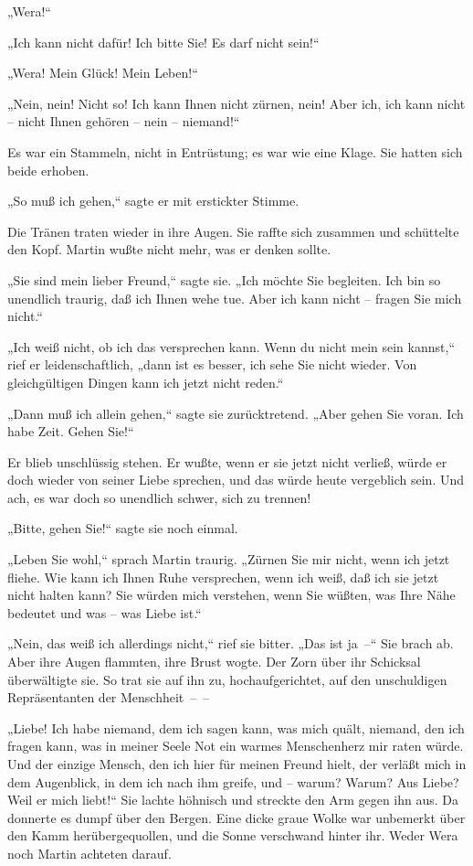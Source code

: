 „Wera!“

„Ich kann nicht dafür! Ich bitte Sie! Es darf nicht sein!“

„Wera! Mein Glück! Mein Leben!“

„Nein, nein! Nicht so! Ich kann Ihnen nicht zürnen, nein! Aber ich,
ich kann nicht – nicht Ihnen gehören – nein – niemand!“

Es war ein Stammeln, nicht in Entrüstung; es war wie eine Klage.
Sie hatten sich beide erhoben.

„So muß ich gehen,“ sagte er mit erstickter Stimme.

Die Tränen traten wieder in ihre Augen. Sie raffte sich zusammen
und schüttelte den Kopf. Martin wußte nicht mehr, was er denken
sollte.

„Sie sind mein lieber Freund,“ sagte sie. „Ich möchte Sie
begleiten. Ich bin so unendlich traurig, daß ich Ihnen wehe tue.
Aber ich kann nicht – fragen Sie mich nicht.“

„Ich weiß nicht, ob ich das versprechen kann. Wenn du nicht mein
sein kannst,“ rief er leidenschaftlich, „dann ist es besser, ich
sehe Sie nicht wieder. Von gleichgültigen Dingen kann ich jetzt
nicht reden.“

„Dann muß ich allein gehen,“ sagte sie zurücktretend. „Aber gehen
Sie voran. Ich habe Zeit. Gehen Sie!“

Er blieb unschlüssig stehen. Er wußte, wenn er sie jetzt nicht
verließ, würde er doch wieder von seiner Liebe sprechen, und das
würde heute vergeblich sein. Und ach, es war doch so unendlich
schwer, sich zu trennen!

„Bitte, gehen Sie!“ sagte sie noch einmal.

„Leben Sie wohl,“ sprach Martin traurig. „Zürnen Sie mir nicht,
wenn ich jetzt fliehe. Wie kann ich Ihnen Ruhe versprechen, wenn
ich weiß, daß ich sie jetzt nicht halten kann? Sie würden mich
verstehen, wenn Sie wüßten, was Ihre Nähe bedeutet und was – was
Liebe ist.“

„Nein, das weiß ich allerdings nicht,“ rief sie bitter. „Das ist
ja~–“ Sie brach ab. Aber ihre Augen flammten, ihre Brust wogte. Der
Zorn über ihr Schicksal überwältigte sie. So trat sie auf ihn zu,
hochaufgerichtet, auf den unschuldigen Repräsentanten der
Menschheit~–~–

„Liebe! Ich habe niemand, dem ich sagen kann, was mich quält,
niemand, den ich fragen kann, was in meiner Seele Not ein warmes
Menschenherz mir raten würde. Und der einzige Mensch, den ich hier
für meinen Freund hielt, der verläßt mich in dem Augenblick, in dem
ich nach ihm greife, und – warum? Warum? Aus Liebe? Weil er mich
liebt!“ Sie lachte höhnisch und streckte den Arm gegen ihn aus. Da
donnerte es dumpf über den Bergen. Eine dicke graue Wolke war
unbemerkt über den Kamm herübergequollen, und die Sonne verschwand
hinter ihr. Weder Wera noch Martin achteten darauf.

